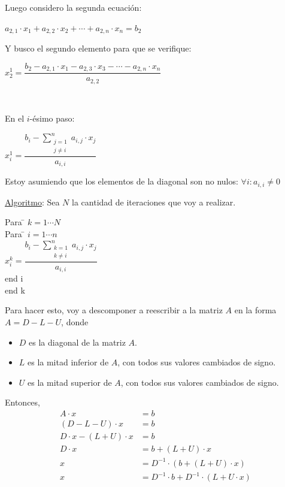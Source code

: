 \documentclass[]{article}
\begin{document}
Luego considero la segunda ecuación:
\begin{center}
	$a_{2,1}\cdot x_1 + a_{2,2}\cdot x_2 + \cdots + a_{2,n}\cdot x_n = b_2$
\end{center}

Y busco el segundo elemento para que se verifique:
\begin{center}
	$x_2^1 = \dfrac{b_2 - a_{2,1}\cdot x_1 - a_{2,3}\cdot x_3 - \cdots - a_{2,n}\cdot x_n}{a_{2,2}}$
\end{center}

~\newline

En el $i$-ésimo paso:
\begin{center}
	$x_i^1 = \dfrac{\displaystyle b_i - \sum_{\substack{j=1 \\ j\neq i}}^{n}{a_{i,j}\cdot x_j}}{a_{i,i}}$
\end{center}

\begin{obs}
	Estoy asumiendo que los elementos de la diagonal son no nulos: $\forall i : a_{i,i} \neq 0$
\end{obs}

\underline{Algoritmo}:
Sea $N$ la cantidad de iteraciones que voy a realizar.
\begin{tabbing}
Para \= $k=1\cdots N$\\
\> Para \= $i=1\cdots n$\\
\> \> $x_i^k = \dfrac{\displaystyle b_i - \sum_{\substack{k=1 \\ k\neq i}}^{n}{a_{i,j}\cdot x_j}}{a_{i,i}}$\\
\> end i\\
end k\\
\end{tabbing}


Para hacer esto, voy a descomponer a reescribir a la matriz $A$ en la forma $A= D-L-U$, donde
\begin{itemize}
	\item $D$ es la diagonal de la matriz $A$.
	\item $L$ es la mitad inferior de $A$, con todos sus valores cambiados de signo.
	\item $U$ es la mitad superior de $A$, con todos sus valores cambiados de signo.
\end{itemize}

Entonces,
\begin{align*}
	A\cdot x &= b\\
	(D-L-U)\cdot x &= b\\
	D\cdot x - (L+U)\cdot x &= b\\
	D\cdot x &= b + (L+U)\cdot x\\
	x &= D^{-1}\cdot (b + (L+U)\cdot x)\\
	x&= D^{-1}\cdot b + D^{-1}\cdot (L+U \cdot x)\\
\end{align*}
\end{document}
